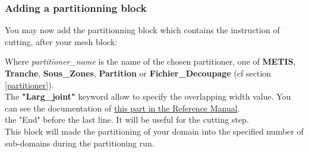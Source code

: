 \subsubsection{Adding a partitionning block}
You may now add the partitionning block which contains the instruction of cutting, after your mesh block:
\begin{center}
\end{center}
Where \textit{partitioner\_name} is the name of the chosen partitioner, one of \textbf{METIS}, \textbf{Tranche}, \textbf{Sous\_Zones}, \textbf{Partition} or \textbf{Fichier\_Decoupage} (cf section \ref{partitioner}).\\
The \textbf{"Larg\_joint"} keyword allow to specify the overlapping width value.
You can see the documentation of \href{../../Outils/TRIOXDATA/XTriou/doc.pdf\#partition}{this part in the \trust Reference Manual}.\\

\Note the "End" before the last line. It will be useful for the cutting step.\\

This block will made the partitioning of your domain into the specified number of sub-domains during the partitioning run.



